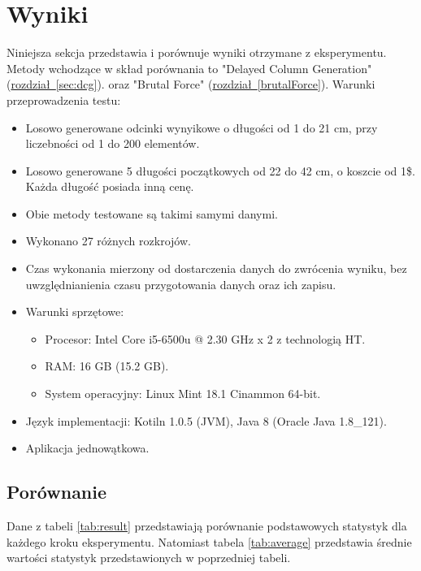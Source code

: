 \section{Wyniki}

Niniejsza sekcja przedstawia i porównuje wyniki otrzymane z eksperymentu. Metody wchodzące w skład porównania to "Delayed Column Generation" (\hyperref[sec:dcg]{rozdział~\ref*{sec:dcg}}). oraz "Brutal Force" (\hyperref[brutalForce]{rozdział~\ref*{brutalForce}}). Warunki przeprowadzenia testu:
\begin{itemize}
  \item Losowo generowane odcinki wynyikowe o długości od 1 do 21 cm, przy liczebności od 1 do 200 elementów.
  \item Losowo generowane 5 długości początkowych od 22 do 42 cm, o koszcie od 1\$. Każda długość posiada inną cenę.
  \item Obie metody testowane są takimi samymi danymi.
  \item Wykonano 27 różnych rozkrojów.
  \item Czas wykonania mierzony od dostarczenia danych do zwrócenia wyniku, bez uwzględnianienia czasu przygotowania danych oraz ich zapisu.
  \item Warunki sprzętowe:
  \begin{itemize}
    \item Procesor: Intel Core i5-6500u @ 2.30 GHz x 2 z technologią HT.
    \item RAM: 16 GB (15.2 GB).
    \item System operacyjny: Linux Mint 18.1 Cinammon 64-bit.
  \end{itemize}
  \item Język implementacji: Kotiln 1.0.5 (JVM), Java 8 (Oracle Java 1.8\_121).
  \item Aplikacja jednowątkowa.
\end{itemize}
\subsection{Porównanie}

Dane z tabeli \ref{tab:result} przedstawiają porównanie podstawowych statystyk dla każdego kroku eksperymentu. Natomiast tabela \ref{tab:average} przedstawia średnie wartości statystyk przedstawionych w poprzedniej tabeli.

